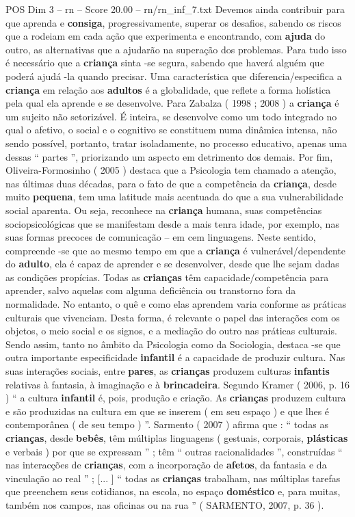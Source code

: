 \begin{textsample}{POS Dim 3 – rn – Score 20.00 – rn/rn\_inf\_7.txt}
Devemos ainda contribuir para que aprenda e \textbf{consiga}, progressivamente, superar os desafios, sabendo os riscos que a rodeiam em cada ação que experimenta e encontrando, com \textbf{ajuda} do outro, as alternativas que a ajudarão na superação dos problemas.
Para tudo isso é necessário que a \textbf{criança} sinta -se segura, sabendo que haverá alguém que poderá ajudá -la quando precisar.
Uma característica que diferencia/especifica a \textbf{criança} em relação aos \textbf{adultos} é a globalidade, que reflete a forma holística pela qual ela aprende e se desenvolve.
Para Zabalza ( 1998 ; 2008 ) a \textbf{criança} é um sujeito não setorizável.
É inteira, se desenvolve como um todo integrado no qual o afetivo, o social e o cognitivo se constituem numa dinâmica intensa, não sendo possível, portanto, tratar isoladamente, no processo educativo, apenas uma dessas “ partes ”, priorizando um aspecto em detrimento dos demais.
Por fim, Oliveira-Formosinho ( 2005 ) destaca que a Psicologia tem chamado a atenção, nas últimas duas décadas, para o fato de que a competência da \textbf{criança}, desde muito \textbf{pequena}, tem uma latitude mais acentuada do que a sua vulnerabilidade social aparenta.
Ou seja, reconhece na \textbf{criança} humana, suas competências sociopsicológicas que se manifestam desde a mais tenra idade, por exemplo, nas suas formas precoces de comunicação – em cem linguagens.
Neste sentido, compreende -se que ao mesmo tempo em que a \textbf{criança} é vulnerável/dependente do \textbf{adulto}, ela é capaz de aprender e se desenvolver, desde que lhe sejam dadas as condições propícias.
Todas as \textbf{crianças} têm capacidade/competência para aprender, salvo aquelas com alguma deficiência ou transtorno fora da normalidade.
No entanto, o quê e como elas aprendem varia conforme as práticas culturais que vivenciam.
Desta forma, é relevante o papel das interações com os objetos, o meio social e os signos, e a mediação do outro nas práticas culturais.
Sendo assim, tanto no âmbito da Psicologia como da Sociologia, destaca -se que outra importante especificidade \textbf{infantil} é a capacidade de produzir cultura.
Nas suas interações sociais, entre \textbf{pares}, as \textbf{crianças} produzem culturas \textbf{infantis} relativas à fantasia, à imaginação e à \textbf{brincadeira}.
Segundo Kramer ( 2006, p. 16 ) “ a cultura \textbf{infantil} é, pois, produção e criação.
As \textbf{crianças} produzem cultura e são produzidas na cultura em que se inserem ( em seu espaço ) e que lhes é contemporânea ( de seu tempo ) ”.
Sarmento ( 2007 ) afirma que : “ todas as \textbf{crianças}, desde \textbf{bebês}, têm múltiplas linguagens ( gestuais, corporais, \textbf{plásticas} e verbais ) por que se expressam ” ; têm “ outras racionalidades ”, construídas “ nas interacções de \textbf{crianças}, com a incorporação de \textbf{afetos}, da fantasia e da vinculação ao real ” ; [... ] “ todas as \textbf{crianças} trabalham, nas múltiplas tarefas que preenchem seus cotidianos, na escola, no espaço \textbf{doméstico} e, para muitas, também nos campos, nas oficinas ou na rua ” ( SARMENTO, 2007, p. 36 ).

\end{textsample}

